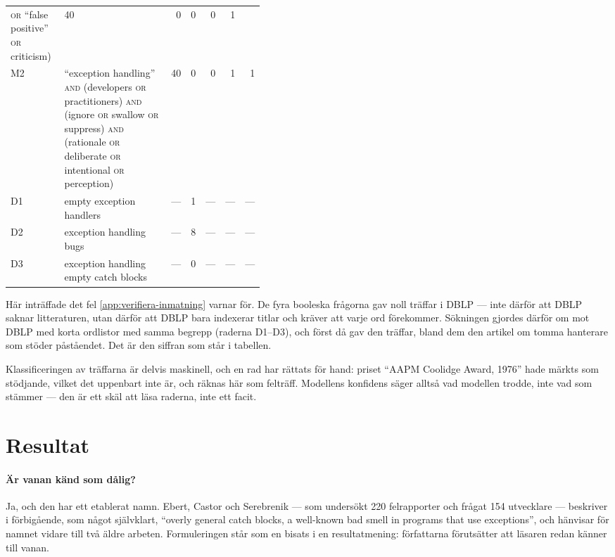 \begin{table}[htbp]
\begin{tabular}{@{}lp{0.42\linewidth}rrrrr@{}}
      \textsc{or} \enquote{false positive} \textsc{or} criticism)
      & 40 & 0 & 0 & 0 & 1 \\
    M2 & \enquote{exception handling} \textsc{and} (developers
      \textsc{or} practitioners) \textsc{and} (ignore \textsc{or}
      swallow \textsc{or} suppress) \textsc{and} (rationale \textsc{or}
      deliberate \textsc{or} intentional \textsc{or} perception)
      & 40 & 0 & 0 & 1 & 1 \\
    D1 & empty exception handlers & --- & 1 & --- & --- & --- \\
    D2 & exception handling bugs & --- & 8 & --- & --- & --- \\
    D3 & exception handling empty catch blocks
      & --- & 0 & --- & --- & --- \\
    \bottomrule
  \end{tabular}
\end{table}

Här inträffade det fel \cref{app:verifiera-inmatning} varnar för.  De fyra
booleska frågorna gav noll träffar i DBLP --- inte därför att DBLP saknar
litteraturen, utan därför att DBLP bara indexerar titlar och kräver att
varje ord förekommer.  Sökningen gjordes därför om mot DBLP med korta
ordlistor med samma begrepp (raderna D1--D3), och först då gav den
träffar, bland dem den artikel om tomma hanterare som stöder
påståendet.  Det är den siffran som står i tabellen.

Klassificeringen av träffarna är delvis maskinell, och en rad har
rättats för hand: priset \enquote{AAPM Coolidge Award, 1976} hade
märkts som stödjande, vilket det uppenbart inte är, och räknas här som
felträff.  Modellens konfidens säger alltså vad modellen trodde, inte
vad som stämmer --- den är ett skäl att läsa raderna, inte ett facit.

\section{Resultat}
\label{sec:ca-resultat}

\paragraph{Är vanan känd som dålig?}
Ja, och den har ett etablerat namn.  Ebert, Castor och Serebrenik ---
som undersökt 220 felrapporter och frågat 154 utvecklare --- beskriver i
förbigående, som något självklart, \enquote{overly general catch blocks,
a well-known bad smell in programs that use
exceptions}\autocite[83]{EbertCastor2015}, och hänvisar för namnet
vidare till två äldre arbeten.  Formuleringen står som en bisats i en
resultatmening: författarna förutsätter att läsaren redan känner till
vanan.

